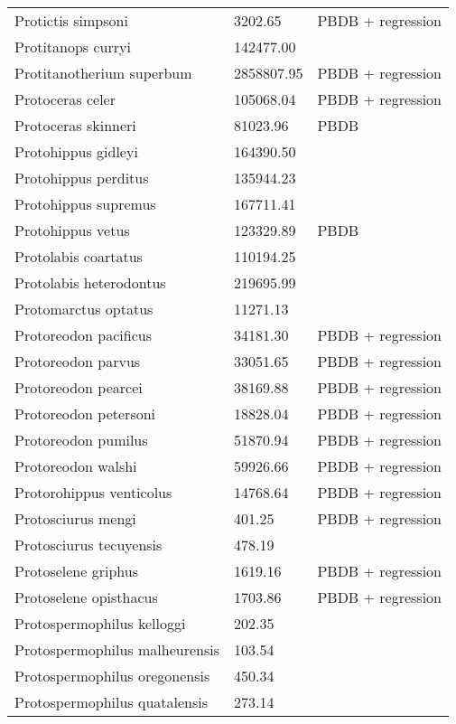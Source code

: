 \documentclass{article}
\begin{document}
\begin{center}
\begin{longtable}{p{} p{} p{}}
    Protictis simpsoni & 3202.65 & PBDB + regression \\ 
    Protitanops curryi & 142477.00 & \cite{McKenna2011} \\ 
    Protitanotherium superbum & 2858807.95 & PBDB + regression \\ 
    Protoceras celer & 105068.04 & PBDB + regression \\ 
    Protoceras skinneri & 81023.96 & PBDB \\ 
    Protohippus gidleyi & 164390.50 & \cite{Tomiya2013} \\ 
    Protohippus perditus & 135944.23 & \cite{Tomiya2013} \\ 
    Protohippus supremus & 167711.41 & \cite{Tomiya2013} \\ 
    Protohippus vetus & 123329.89 & PBDB \\ 
    Protolabis coartatus & 110194.25 & \cite{Tomiya2013} \\ 
    Protolabis heterodontus & 219695.99 & \cite{Tomiya2013} \\ 
    Protomarctus optatus & 11271.13 & \cite{Tomiya2013} \\ 
    Protoreodon pacificus & 34181.30 & PBDB + regression \\ 
    Protoreodon parvus & 33051.65 & PBDB + regression \\ 
    Protoreodon pearcei & 38169.88 & PBDB + regression \\ 
    Protoreodon petersoni & 18828.04 & PBDB + regression \\ 
    Protoreodon pumilus & 51870.94 & PBDB + regression \\ 
    Protoreodon walshi & 59926.66 & PBDB + regression \\ 
    Protorohippus venticolus & 14768.64 & PBDB + regression \\ 
    Protosciurus mengi & 401.25 & PBDB + regression \\ 
    Protosciurus tecuyensis & 478.19 & \cite{Tomiya2013} \\ 
    Protoselene griphus & 1619.16 & PBDB + regression \\ 
    Protoselene opisthacus & 1703.86 & PBDB + regression \\ 
    Protospermophilus kelloggi & 202.35 & \cite{Tomiya2013} \\ 
    Protospermophilus malheurensis & 103.54 & \cite{Tomiya2013} \\ 
    Protospermophilus oregonensis & 450.34 & \cite{Tomiya2013} \\ 
    Protospermophilus quatalensis & 273.14 & \cite{Tomiya2013} \\ 

\end{longtable}
\end{center}
\end{document}
